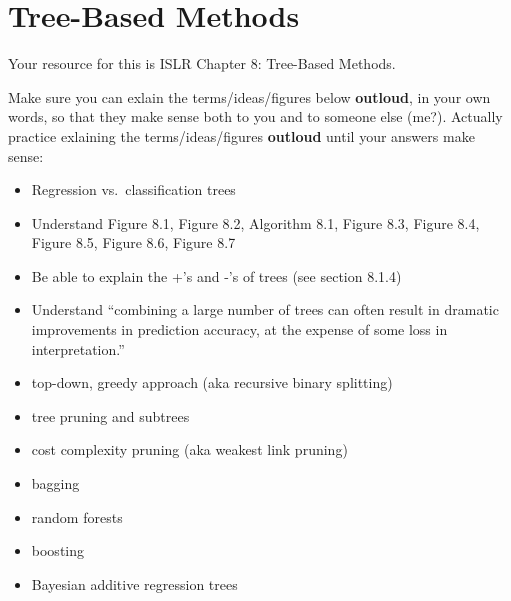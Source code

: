 \documentclass[
]{book}
\providecommand{\tightlist}{%
  \setlength{\itemsep}{0pt}\setlength{\parskip}{0pt}}
\begin{document}
\hypertarget{tree-based-methods}{%
\chapter{Tree-Based Methods}\label{tree-based-methods}}

Your resource for this is ISLR Chapter 8: Tree-Based Methods.

Make sure you can exlain the terms/ideas/figures below \textbf{outloud}, in your own words, so that they make sense both to you and to someone else (me?). Actually practice exlaining the terms/ideas/figures \textbf{outloud} until your answers make sense:

\begin{itemize}
\tightlist
\item
  Regression vs.~classification trees
\item
  Understand Figure 8.1, Figure 8.2, Algorithm 8.1, Figure 8.3, Figure 8.4, Figure 8.5, Figure 8.6, Figure 8.7
\item
  Be able to explain the +'s and -'s of trees (see section 8.1.4)
\item
  Understand ``combining a large number of trees
  can often result in dramatic improvements in prediction accuracy, at the expense of some loss in interpretation.''
\item
  top-down, greedy approach (aka recursive binary splitting)
\item
  tree pruning and subtrees
\item
  cost complexity pruning (aka weakest link pruning)
\item
  bagging
\item
  random forests
\item
  boosting
\item
  Bayesian additive regression trees
\end{itemize}

  
\end{document}
